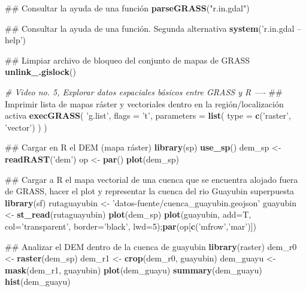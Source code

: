 \documentclass[11pt,]{article}
\newenvironment{Shaded}{\begin{snugshade}}{\end{snugshade}}
\newcommand{\KeywordTok}[1]{\textcolor[rgb]{0.13,0.29,0.53}{\textbf{#1}}}
\newcommand{\DataTypeTok}[1]{\textcolor[rgb]{0.13,0.29,0.53}{#1}}
\newcommand{\DecValTok}[1]{\textcolor[rgb]{0.00,0.00,0.81}{#1}}
\newcommand{\StringTok}[1]{\textcolor[rgb]{0.31,0.60,0.02}{#1}}
\newcommand{\CommentTok}[1]{\textcolor[rgb]{0.56,0.35,0.01}{\textit{#1}}}
\newcommand{\NormalTok}[1]{#1}
\begin{document}
\begin{Shaded}
\begin{Highlighting}[]
\NormalTok{## Consultar la ayuda de una función}
\KeywordTok{parseGRASS}\NormalTok{(}\StringTok{"r.in.gdal"}\NormalTok{)}

\NormalTok{## Consultar la ayuda de una función. Segunda alternativa}
\KeywordTok{system}\NormalTok{(}\StringTok{'r.in.gdal --help'}\NormalTok{)}

\NormalTok{## Limpiar archivo de bloqueo del conjunto de mapas de GRASS}
\KeywordTok{unlink_.gislock}\NormalTok{()}

\CommentTok{# Video no. 5, Explorar datos espaciales básicos entre GRASS y R ----}
\NormalTok{## Imprimir lista de mapas ráster y vectoriales dentro en la región/localización activa}
\KeywordTok{execGRASS}\NormalTok{(}
  \StringTok{'g.list'}\NormalTok{,}
  \DataTypeTok{flags =} \StringTok{'t'}\NormalTok{,}
  \DataTypeTok{parameters =} \KeywordTok{list}\NormalTok{(}
    \DataTypeTok{type =} \KeywordTok{c}\NormalTok{(}\StringTok{'raster'}\NormalTok{, }\StringTok{'vector'}\NormalTok{)}
\NormalTok{  )}
\NormalTok{)}

\NormalTok{## Cargar en R el DEM (mapa ráster)}
\KeywordTok{library}\NormalTok{(sp)}
\KeywordTok{use_sp}\NormalTok{()}
\NormalTok{dem_sp <-}\StringTok{ }\KeywordTok{readRAST}\NormalTok{(}\StringTok{'dem'}\NormalTok{)}
\NormalTok{op <-}\StringTok{ }\KeywordTok{par}\NormalTok{()}
\KeywordTok{plot}\NormalTok{(dem_sp)}

\NormalTok{## Cargar a R el mapa vectorial de una cuenca que se encuentra alojado fuera de GRASS, hacer el plot y representar la cuenca del rio Guayubin superpuesta}
\KeywordTok{library}\NormalTok{(sf)}
\NormalTok{rutaguayubin <-}\StringTok{ 'datos-fuente/cuenca_guayubin.geojson'}
\NormalTok{guayubin <-}\StringTok{ }\KeywordTok{st_read}\NormalTok{(rutaguayubin)}
\KeywordTok{plot}\NormalTok{(dem_sp)}
\KeywordTok{plot}\NormalTok{(guayubin, }\DataTypeTok{add=}\NormalTok{T, }\DataTypeTok{col=}\StringTok{'transparent'}\NormalTok{, }\DataTypeTok{border=}\StringTok{'black'}\NormalTok{, }\DataTypeTok{lwd=}\DecValTok{5}\NormalTok{);}\KeywordTok{par}\NormalTok{(op[}\KeywordTok{c}\NormalTok{(}\StringTok{'mfrow'}\NormalTok{,}\StringTok{'mar'}\NormalTok{)])}

\NormalTok{## Analizar el DEM dentro de la cuenca de guayubin}
\KeywordTok{library}\NormalTok{(raster)}
\NormalTok{dem_r0 <-}\StringTok{ }\KeywordTok{raster}\NormalTok{(dem_sp)}
\NormalTok{dem_r1 <-}\StringTok{ }\KeywordTok{crop}\NormalTok{(dem_r0, guayubin)}
\NormalTok{dem_guayu <-}\StringTok{ }\KeywordTok{mask}\NormalTok{(dem_r1, guayubin)}
\KeywordTok{plot}\NormalTok{(dem_guayu)}
\KeywordTok{summary}\NormalTok{(dem_guayu)}
\KeywordTok{hist}\NormalTok{(dem_guayu)}


\end{Highlighting}
\end{Shaded}
\end{document}
